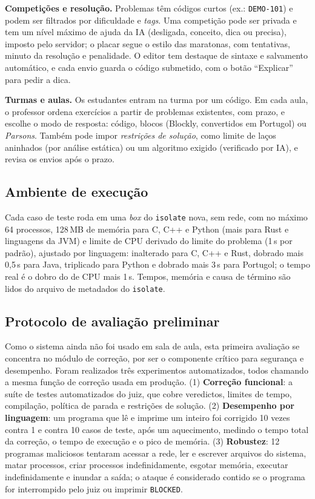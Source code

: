 \documentclass[12pt]{article}
\begin{document}
\textbf{Competições e resolução.} Problemas têm códigos curtos (ex.: \texttt{DEMO-101}) e podem ser filtrados por dificuldade e \emph{tags}. Uma competição pode ser privada e tem um nível máximo de ajuda da IA (desligada, conceito, dica ou precisa), imposto pelo servidor; o placar segue o estilo das maratonas, com tentativas, minuto da resolução e penalidade. O editor tem destaque de sintaxe e salvamento automático, e cada envio guarda o código submetido, com o botão ``Explicar'' para pedir a dica.

\textbf{Turmas e aulas.} Os estudantes entram na turma por um código. Em cada aula, o professor ordena exercícios a partir de problemas existentes, com prazo, e escolhe o modo de resposta: código, blocos (Blockly, convertidos em Portugol) ou \emph{Parsons}. Também pode impor \emph{restrições de solução}, como limite de laços aninhados (por análise estática) ou um algoritmo exigido (verificado por IA), e revisa os envios após o prazo.

\subsection{Ambiente de execução}

Cada caso de teste roda em uma \emph{box} do \texttt{isolate} nova, sem rede, com no máximo 64 processos, 128\,MB de memória para C, C++ e Python (mais para Rust e linguagens da JVM) e limite de CPU derivado do limite do problema (1\,s por padrão), ajustado por linguagem: inalterado para C, C++ e Rust, dobrado mais 0,5\,s para Java, triplicado para Python e dobrado mais 3\,s para Portugol; o tempo real é o dobro do de CPU mais 1\,s. Tempos, memória e causa de término são lidos do arquivo de metadados do \texttt{isolate}.

\subsection{Protocolo de avaliação preliminar}\label{sec:protocolo}

Como o sistema ainda não foi usado em sala de aula, esta primeira avaliação se concentra no módulo de correção, por ser o componente crítico para segurança e desempenho. Foram realizados três experimentos automatizados, todos chamando a mesma função de correção usada em produção. (1) \textbf{Correção funcional}: a suíte de testes automatizados do juiz, que cobre veredictos, limites de tempo, compilação, política de parada e restrições de solução. (2) \textbf{Desempenho por linguagem}: um programa que lê e imprime um inteiro foi corrigido 10 vezes contra 1 e contra 10 casos de teste, após um aquecimento, medindo o tempo total da correção, o tempo de execução e o pico de memória. (3) \textbf{Robustez}: 12 programas maliciosos tentaram acessar a rede, ler e escrever arquivos do sistema, matar processos, criar processos indefinidamente, esgotar memória, executar indefinidamente e inundar a saída; o ataque é considerado contido se o programa for interrompido pelo juiz ou imprimir \texttt{BLOCKED}.
\end{document}
